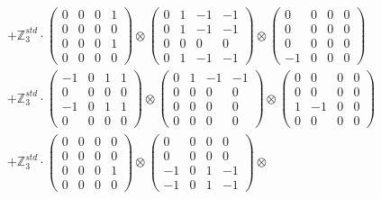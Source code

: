 \documentclass{article}
\begin{document}
{\begin{align}
        &+ \label{Rs16-Rc11-Solution-25-c22} \mathbb{Z}_3^{std} \cdot 
            \begin{pmatrix} 0 & 0 & 0 & 1 \\ 0 & 0 & 0 & 0 \\ 0 & 0 & 0 & 1 \\ 0 & 0 & 0 & 0 \end{pmatrix} \otimes 
            \begin{pmatrix} 0 & 1 & -1 & -1 \\ 0 & 1 & -1 & -1 \\ 0 & 0 & 0 & 0 \\ 0 & 1 & -1 & -1 \end{pmatrix} \otimes 
            \begin{pmatrix} 0 & 0 & 0 & 0 \\ 0 & 0 & 0 & 0 \\ 0 & 0 & 0 & 0 \\ -1 & 0 & 0 & 0 \end{pmatrix} \\ 
        &+ \label{Rs16-Rc11-Solution-25-c23} \mathbb{Z}_3^{std} \cdot 
            \begin{pmatrix} -1 & 0 & 1 & 1 \\ 0 & 0 & 0 & 0 \\ -1 & 0 & 1 & 1 \\ 0 & 0 & 0 & 0 \end{pmatrix} \otimes 
            \begin{pmatrix} 0 & 1 & -1 & -1 \\ 0 & 0 & 0 & 0 \\ 0 & 0 & 0 & 0 \\ 0 & 0 & 0 & 0 \end{pmatrix} \otimes 
            \begin{pmatrix} 0 & 0 & 0 & 0 \\ 0 & 0 & 0 & 0 \\ 1 & -1 & 0 & 0 \\ 0 & 0 & 0 & 0 \end{pmatrix} \\ 
        &+ \label{Rs16-Rc11-Solution-25-c24} \mathbb{Z}_3^{std} \cdot 
            \begin{pmatrix} 0 & 0 & 0 & 0 \\ 0 & 0 & 0 & 0 \\ 0 & 0 & 0 & 1 \\ 0 & 0 & 0 & 0 \end{pmatrix} \otimes 
            \begin{pmatrix} 0 & 0 & 0 & 0 \\ 0 & 0 & 0 & 0 \\ -1 & 0 & 1 & -1 \\ -1 & 0 & 1 & -1 \end{pmatrix} \otimes 

\end{align}}
\end{document}
